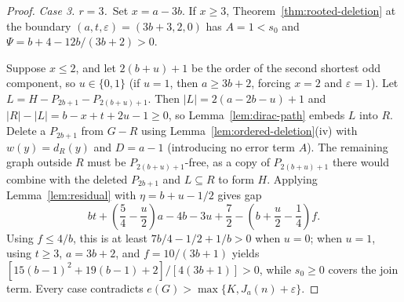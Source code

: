 \documentclass[10pt]{article}
\theoremstyle{compactplain}
\theoremstyle{remark}\newtheorem{remark}[theorem]{Remark}
\begin{document}
\begin{proof}
\medskip\noindent\emph{Case 3. $r=3$.}\ 
Set $x=a-3b$. If $x\ge3$, Theorem~\ref{thm:rooted-deletion} at the
boundary $(a,t,\varepsilon)=(3b+3,2,0)$ has $A=1<s_0$ and
$\Psi=b+4-12b/(3b+2)>0$.

Suppose $x\le2$, and let $2(b+u)+1$ be the order of the second shortest
odd component, so $u\in\{0,1\}$ (if $u=1$, then $a\ge3b+2$, forcing
$x=2$ and $\varepsilon=1$). Let $L=H-P_{2b+1}-P_{2(b+u)+1}$. Then
$|L|=2(a-2b-u)+1$ and $|R|-|L|=b-x+t+2u-1\ge0$, so
Lemma~\ref{lem:dirac-path} embeds $L$ into $R$. Delete a $P_{2b+1}$ from
$G-R$ using Lemma~\ref{lem:ordered-deletion}(iv) with $w(y)=d_R(y)$ and
$D=a-1$ (introducing no error term $A$). The remaining graph outside $R$
must be $P_{2(b+u)+1}$-free, as a copy of $P_{2(b+u)+1}$ there would
combine with the deleted $P_{2b+1}$ and $L\subseteq R$ to form $H$.
Applying Lemma~\ref{lem:residual} with $\eta=b+u-1/2$ gives gap
\[
 bt+\left(\frac{5}{4}-\frac{u}{2}\right)a-4b-3u+\frac{7}{2}
 -\left(b+\frac{u}{2}-\frac{1}{4}\right)f.
\]
Using $f\le4/b$, this is at least $7b/4-1/2+1/b>0$ when $u=0$; when
$u=1$, using $t\ge3$, $a=3b+2$, and $f=10/(3b+1)$ yields
$[15(b-1)^2+19(b-1)+2]/[4(3b+1)]>0$, while $s_0\ge0$ covers the join
term. Every case contradicts $e(G)>\max\{K,J_a(n)+\varepsilon\}$.
\end{proof}
\end{document}
